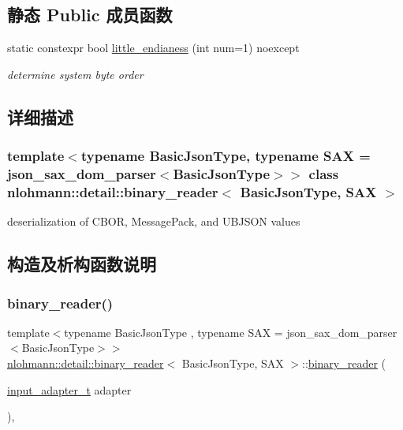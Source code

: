 \subsection*{静态 Public 成员函数}
\begin{DoxyCompactItemize}
\item 
static constexpr bool \mbox{\hyperlink{classnlohmann_1_1detail_1_1binary__reader_a1e31dbfcf9567c8c2d4f0e4eb1b0230a}{little\+\_\+endianess}} (int num=1) noexcept
\begin{DoxyCompactList}\small\item\em determine system byte order \end{DoxyCompactList}\end{DoxyCompactItemize}


\subsection{详细描述}
\subsubsection*{template$<$typename Basic\+Json\+Type, typename S\+AX = json\+\_\+sax\+\_\+dom\+\_\+parser$<$\+Basic\+Json\+Type$>$$>$\newline
class nlohmann\+::detail\+::binary\+\_\+reader$<$ Basic\+Json\+Type, S\+A\+X $>$}

deserialization of C\+B\+OR, Message\+Pack, and U\+B\+J\+S\+ON values 

\subsection{构造及析构函数说明}
\mbox{\label{classnlohmann_1_1detail_1_1binary__reader_aed84f0302eb232d3b69f7653bef2337a}} 
\subsubsection{\texorpdfstring{binary\_reader()}{binary\_reader()}}
{\footnotesize\ttfamily template$<$typename Basic\+Json\+Type , typename S\+AX  = json\+\_\+sax\+\_\+dom\+\_\+parser$<$\+Basic\+Json\+Type$>$$>$ \\
\mbox{\hyperlink{classnlohmann_1_1detail_1_1binary__reader}{nlohmann\+::detail\+::binary\+\_\+reader}}$<$ Basic\+Json\+Type, S\+AX $>$\+::\mbox{\hyperlink{classnlohmann_1_1detail_1_1binary__reader}{binary\+\_\+reader}} (\begin{DoxyParamCaption}\item[{\mbox{\hyperlink{namespacenlohmann_1_1detail_ae132f8cd5bb24c5e9b40ad0eafedf1c2}{input\+\_\+adapter\+\_\+t}}}]{adapter }\end{DoxyParamCaption})\hspace{0.3cm}{\ttfamily [inline]}, {\ttfamily [explicit]}}



